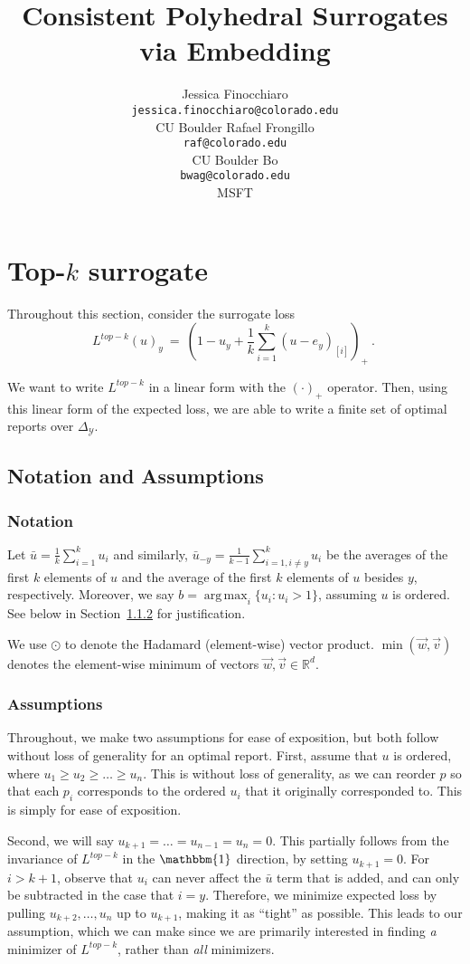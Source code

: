 \documentclass[12pt]{article}
\title{Consistent Polyhedral Surrogates via Embedding}
\author{%
 Jessica Finocchiaro\raf{Jessie?} \\
 \texttt{jessica.finocchiaro@colorado.edu}\\
 CU Boulder
 \And
 Rafael Frongillo\\
 \texttt{raf@colorado.edu}\\
 CU Boulder
 \And
 Bo\\
 \texttt{bwag@colorado.edu}\\
 MSFT
}
\newcommand{\reals}{\mathbb{R}}
\newcommand{\simplex}{\Delta_\Y}
\newcommand{\Y}{\mathcal{Y}}
\newcommand{\ones}{\mathbbm{1}}
\DeclareMathOperator*{\argmax}{arg\,max}
\begin{document}
\section{Top-$k$ surrogate}
Throughout this section, consider the surrogate loss \begin{equation}\label{eq:top-k-surrogate}
L^{top-k}(u)_y~=~\left(1 - u_y + \frac{1}{k} \sum_{i=1}^k (u - e_y)_{[i]} \right)_+~.~
\end{equation}

We want to write $L^{top-k}$ in a linear form with the $(\cdot)_+$ operator.
Then, using this linear form of the expected loss, we are able to write a finite set of optimal reports over $\simplex$.

\subsection{Notation and Assumptions}
\subsubsection{Notation}
Let $\bar{u} = \frac 1 k \sum_{i = 1}^k u_i$ and similarly, $\bar{u}_{-y} = \frac{1}{k-1} \sum_{i=1, i \neq y}^k u_i$ be the averages of the first $k$ elements of $u$ and the average of the first $k$ elements of $u$ besides $y$, respectively.
Moreover, we say $b = \argmax_i \{u_i : u_i > 1\}$, assuming $u$ is ordered.
See below in Section~\ref{sec:assumptions} for justification.

We use $\odot$ to denote the Hadamard (element-wise) vector product.
$\min(\vec w, \vec v)$ denotes the element-wise minimum of vectors $\vec w, \vec v \in \reals^d$.

\subsubsection{Assumptions}\label{sec:assumptions}
Throughout, we make two assumptions for ease of exposition, but both follow without loss of generality for an optimal report.  %
First, assume that $u$ is ordered, where $u_1 \geq u_2 \geq \ldots \geq u_n$.
This is without loss of generality, as we can reorder $p$ so that each $p_i$ corresponds to the ordered $u_i$ that it originally corresponded to.
This is simply for ease of exposition.

Second, we will say $u_{k+1} = \ldots = u_{n-1} = u_n = 0$.
This partially follows from the invariance of $L^{top-k}$ in the $\ones$ direction, by setting $u_{k+1} = 0$.
For $i > k+1$, observe that $u_i$ can never affect the $\bar{u}$ term that is added, and can only be subtracted in the case that $i = y$.
Therefore, we minimize expected loss by pulling $u_{k+2},\ldots, u_n$ up to $u_{k+1}$, making it as ``tight'' as possible.
This leads to our assumption, which we can make since we are primarily interested in finding \emph{a} minimizer of $L^{top-k}$, rather than \emph{all} minimizers.
\end{document}
